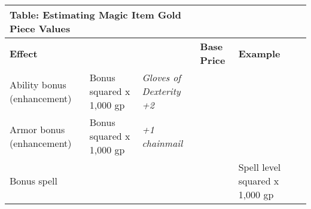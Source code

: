 \vspace{12pt}
\begin{longtable}{llllll}
\hline
\multicolumn{3}{|p{4.373in}|}{\begin{minipage}[t]{4.373in}\raggedright
\textbf{Table: Estimating Magic Item Gold Piece Values}\end{minipage}}\\
\hline
\multicolumn{3}{p{0.127in}|}{\begin{minipage}[t]{0.127in}\raggedright
\textbf{Effect }\end{minipage}} & \multicolumn{1}{|p{1.506in}|}{\begin{minipage}[t]{1.506in}\raggedright
\textbf{Base Price }\end{minipage}} & \multicolumn{1}{p{1.628in}|}{\begin{minipage}[t]{1.628in}\raggedright
\textbf{Example}\end{minipage}}\\
\hline
\multicolumn{1}{p{1.239in}|}{\begin{minipage}[t]{1.239in}\raggedright
Ability bonus (enhancement) \end{minipage}} & \multicolumn{1}{p{0.042in}|}{\begin{minipage}[t]{0.042in}\raggedright
Bonus squared  x 1,000 gp \end{minipage}} & \multicolumn{1}{p{0.042in}|}{\begin{minipage}[t]{0.042in}\raggedright
\textit{Gloves of Dexterity +2}\end{minipage}}\\
\hline
\multicolumn{1}{p{0.042in}|}{\begin{minipage}[t]{0.042in}\raggedright
Armor bonus (enhancement) \end{minipage}} & \multicolumn{1}{|p{1.506in}|}{\begin{minipage}[t]{1.506in}\raggedright
Bonus squared  x 1,000 gp \end{minipage}} & \multicolumn{1}{p{1.628in}|}{\begin{minipage}[t]{1.628in}\raggedright
\textit{+1 chainmail}\end{minipage}}\\
\hline
\multicolumn{4}{p{1.366in}|}{\begin{minipage}[t]{1.366in}\raggedright
Bonus spell \end{minipage}} & \multicolumn{1}{p{0.042in}|}{\begin{minipage}[t]{0.042in}\raggedright
Spell level squared  x 1,000 gp \end{minipage}} & \multicolumn{1}{p{0.042in}|}{\begin{minipage}[t]{0.042in}\raggedright

\end{minipage}}
\end{longtable}
